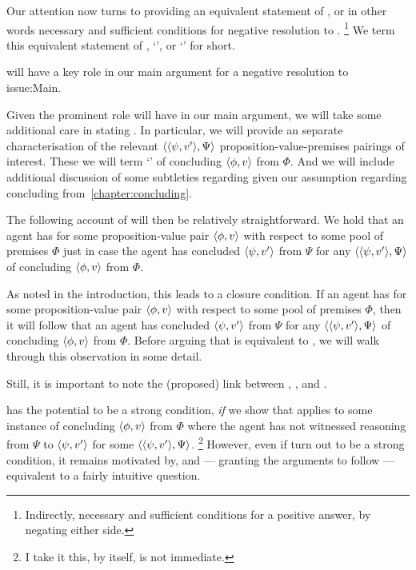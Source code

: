 \begin{note}
  Our attention now turns to providing an equivalent statement of \zS{}, or in other words necessary and sufficient conditions for negative resolution to \qzS{}.%
  \footnote{
    Indirectly, necessary and sufficient conditions for a positive answer, by negating either side.
  }
  We term this equivalent statement of \zS{}, `\izetaS{}', or `\zetaS{}' for short.

  \zetaS{} will have a key role in our main argument for a negative resolution to~{\color{red} issue:Main}.

  Given the prominent role \zetaS{} will have in our main argument, we will take some additional care in stating \zetaS{}.
  In particular, we will provide an separate characterisation of the relevant \(\langle \langle \psi, v' \rangle, \Psi \rangle\) proposition-value-premises pairings of interest.
  These we will term `' of concluding \(\langle \phi, v \rangle\) from \(\Phi\).
  And we will include additional discussion of some subtleties regarding  given our assumption regarding concluding from~\autoref{chapter:concluding}.

  The following account of \zetaS{} will then be relatively straightforward.
  We hold that an agent has \zetaS{} for some proposition-value pair \(\langle \phi, v \rangle\) with respect to some pool of premises \(\Phi\) just in case the agent has concluded \(\langle \psi, v' \rangle\) from \(\Psi\) for any \requ{} \(\langle \langle \psi, v' \rangle, \Psi \rangle\) of concluding \(\langle \phi, v \rangle\) from \(\Phi\).

  As noted in the introduction, this leads to a closure condition.
  If an agent has \zetaS{} for some proposition-value pair \(\langle \phi, v \rangle\) with respect to some pool of premises \(\Phi\), then it will follow that an agent has concluded \(\langle \psi, v' \rangle\) from \(\Psi\) for any \requ{} \(\langle \langle \psi, v' \rangle, \Psi \rangle\) of concluding \(\langle \phi, v \rangle\) from \(\Phi\).
  Before arguing that \zetaS{} is equivalent to \zS{}, we will walk through this observation in some detail.
\end{note}

\begin{note}
  Still, it is important to note the (proposed) link between \qzS{}, \zS{}, and \zetaS{}.

  \zetaS{} has the potential to be a strong condition, \emph{if} we show that \zetaS{} applies to some instance of concluding \(\langle \phi, v \rangle\) from \(\Phi\) where the agent has not witnessed reasoning from \(\Psi\) to \(\langle \psi, v' \rangle\) for some \requ{} \(\langle \langle \psi, v' \rangle, \Psi \rangle\).%
  \footnote{
    I take it this, by itself, is not immediate.
  }
  However, even if \zetaS{} turn out to be a strong condition, it remains motivated by, and --- granting the arguments to follow --- equivalent to a fairly intuitive question.
\end{note}

